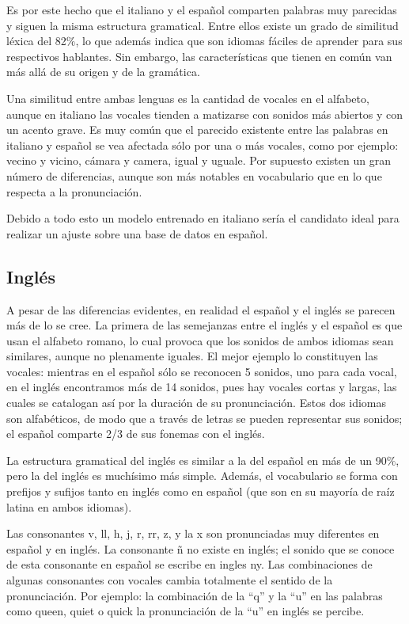 Es por este hecho que el italiano y el español comparten palabras muy parecidas y siguen la misma estructura gramatical. Entre ellos existe un grado de similitud léxica del 82$\%$, lo que además indica que son idiomas fáciles de aprender para sus respectivos hablantes. Sin embargo, las características que tienen en común van más allá de su origen y de la gramática.

Una similitud entre ambas lenguas es la cantidad de vocales en el alfabeto, aunque en italiano las vocales tienden a matizarse con sonidos más abiertos y con un acento grave. Es muy común que el parecido existente entre las palabras en italiano y español se vea afectada sólo por una o más vocales, como por ejemplo: vecino y vicino, cámara y camera, igual y uguale. Por supuesto existen un gran número de diferencias, aunque son más notables en vocabulario que en lo que respecta a la pronunciación. 

Debido a todo esto un modelo entrenado en italiano sería el candidato ideal para realizar un ajuste sobre una base de datos en español. 
\subsection{Inglés}

A pesar de las diferencias evidentes, en realidad el español y el inglés se parecen más de lo se cree. La primera de las semejanzas entre el inglés y el español es que usan el alfabeto romano, lo cual provoca que los sonidos de ambos idiomas sean similares, aunque no plenamente iguales. El mejor ejemplo lo constituyen las vocales: mientras en el español sólo se reconocen 5 sonidos, uno para cada vocal, en el inglés encontramos más de 14 sonidos, pues hay vocales cortas y largas, las cuales se catalogan así por la duración de su pronunciación. Estos dos idiomas son alfabéticos, de modo que a través de letras se pueden representar sus sonidos; el español comparte 2/3 de sus fonemas con el inglés.

La estructura gramatical del inglés es similar a la del español en más de un 90$\%$, pero la del inglés es muchísimo más simple. Además, el vocabulario se forma con prefijos y sufijos tanto en inglés como en español (que son en su mayoría de raíz latina en ambos idiomas).

Las consonantes v, ll, h, j, r, rr, z, y  la x son pronunciadas muy diferentes en español y en inglés. La consonante ñ no existe en inglés; el sonido que se conoce de esta consonante en español se escribe en ingles ny. Las combinaciones de algunas consonantes con vocales cambia totalmente el sentido de la pronunciación. Por ejemplo: la combinación de la “q” y la “u” en las palabras como queen, quiet o quick la pronunciación de  la “u” en inglés se percibe.

